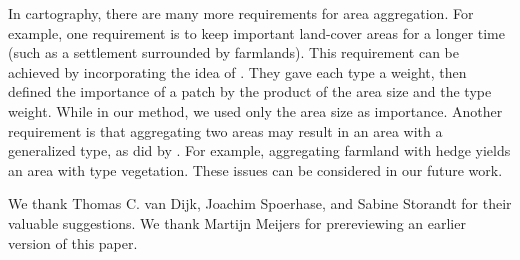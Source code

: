 \documentclass[acmsmall,natbib=false]{acmart}
\begin{document}
In cartography, there are many more requirements 
for area aggregation.
For example, one requirement is 
to keep important land-cover areas for a longer time
(such as a settlement surrounded by farmlands).
This requirement can be achieved by incorporating the idea of
\textcite{Dilo2009tGAP}.
They gave each type a weight, then defined the importance of a patch by the product of the area size and the type weight.
While in our method, we used only the area size as importance.
%
Another requirement is that 
aggregating two areas may result in 
an area with a generalized type,
as did by \textcite{vanSmaalen2003}. 
For example, aggregating 
farmland with hedge yields an area with type vegetation.
%
These issues can be considered in our future work.
%




\begin{acks}
We thank Thomas C. van Dijk, Joachim Spoerhase, 
and Sabine Storandt for their valuable suggestions.
We thank Martijn Meijers for 
prereviewing an earlier version of this paper.
\end{acks}


\printbibliography
\end{document}
